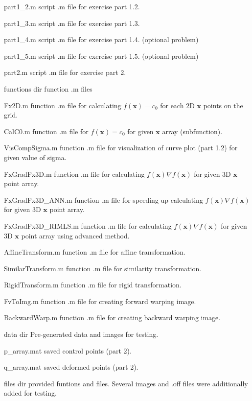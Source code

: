 \documentclass[paper=a4, fontsize=11pt]{scrartcl} %
\numberwithin{equation}{section} %
\numberwithin{figure}{section} %
\numberwithin{table}{section} %
\renewcommand{\vec}[1]{\mathbf{#1}}
\begin{document}
\begin{filedescription}
	\item [part1\_2.m] script .m file for exercise part 1.2.
	\item [part1\_3.m] script .m file for exercise part 1.3.
	\item [part1\_4.m] script .m file for exercise part 1.4. (optional problem)
	\item [part1\_5.m] script .m file for exercise part 1.5. (optional problem)
	\item [part2.m] script .m file for exercise part 2.
	\item [functions dir] function .m files 
		\begin{filedescription}
			\item [Fx2D.m] function .m file for calculating $f(\vec{x}) = c_0$ for each 2D $\vec{x}$ points on the grid.
			\item [CalC0.m] function .m file for $f(\vec{x}) = c_0$ for given $\vec{x}$ array (subfunction).
			\item [VisCompSigma.m] function .m file for visualization of curve plot (part 1.2) for given value of sigma.
			\item [FxGradFx3D.m] function .m file for calculating $f(\vec{x}) \nabla f(\vec{x})$ for given 3D $\vec{x}$ point array.
			\item [FxGradFx3D\_ANN.m] function .m file for speeding up calculating $f(\vec{x}) \nabla f(\vec{x})$ for given 3D $\vec{x}$ point array.
			\item [FxGradFx3D\_RIMLS.m] function .m file for calculating $f(\vec{x}) \nabla f(\vec{x})$ for given 3D $\vec{x}$ point array using advanced method.
			\item [AffineTransform.m] function .m file for affine transformation.
			\item [SimilarTransform.m] function .m file for similarity transformation.    
			\item [RigidTransform.m] function .m file for rigid transformation. 
			\item [FvToImg.m] function .m file for creating forward warping image.
			\item [BackwardWarp.m] function .m file for creating backward warping image.
		\end{filedescription}
	\item [data dir] Pre-generated data and images for testing.
		\begin{filedescription}
			\item [p\_array.mat] saved control points (part 2).  
			\item [q\_array.mat] saved deformed points (part 2).
		\end{filedescription}
	\item [files dir] provided funtions and files. Several images and .off files were additionally added for testing.   
\end{filedescription}
\end{document}
